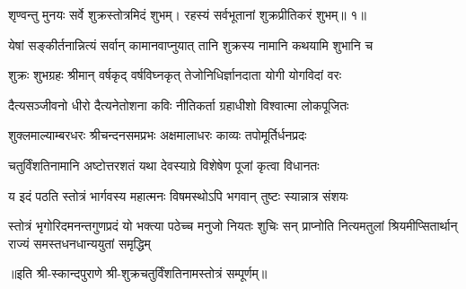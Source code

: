 

\twolineshloka
{शृण्वन्तु मुनयः सर्वे शुक्रस्तोत्रमिदं शुभम्।}
{रहस्यं सर्वभूतानां शुक्रप्रीतिकरं शुभम्॥ १॥}

\twolineshloka
{येषां सङ्कीर्तनान्नित्यं सर्वान् कामानवाप्नुयात्}
{तानि शुक्रस्य नामानि कथयामि शुभानि च}

\twolineshloka
{शुक्रः शुभग्रहः श्रीमान् वर्षकृद् वर्षविघ्नकृत्}
{तेजोनिधिर्ज्ञानदाता योगी योगविदां वरः}

\twolineshloka
{दैत्यसञ्जीवनो धीरो दैत्यनेतोशना कविः}
{नीतिकर्ता ग्रहाधीशो विश्वात्मा लोकपूजितः}

\twolineshloka
{शुक्लमाल्याम्बरधरः श्रीचन्दनसमप्रभः}
{अक्षमालाधरः काव्यः तपोमूर्तिर्धनप्रदः}

\twolineshloka
{चतुर्विंशतिनामानि अष्टोत्तरशतं यथा}
{देवस्याग्रे विशेषेण पूजां कृत्वा विधानतः}

\twolineshloka
{य इदं पठति स्तोत्रं भार्गवस्य महात्मनः}
{विषमस्थोऽपि भगवान् तुष्टः स्यान्नात्र संशयः}

\fourlineindentedshloka
{स्तोत्रं भृगोरिदमनन्तगुणप्रदं यो}
{भक्त्या पठेच्च मनुजो नियतः शुचिः सन्}
{प्राप्नोति नित्यमतुलां श्रियमीप्सितार्थान्}
{राज्यं समस्तधनधान्ययुतां समृद्धिम्}

॥इति श्री-स्कान्दपुराणे श्री-शुक्रचतुर्विंशतिनामस्तोत्रं सम्पूर्णम्॥
